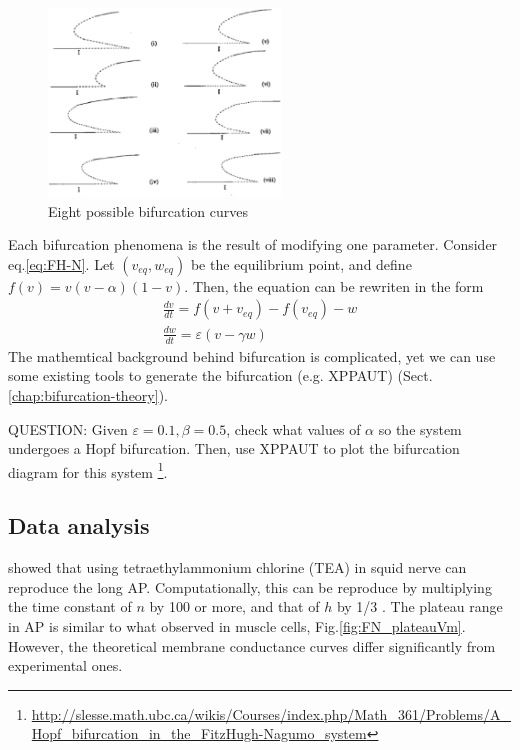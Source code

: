 \begin{figure}[hbt]
  \centerline{\includegraphics[height=5cm,
    angle=0]{./images/FitzHugh-8-bifurcations.eps}}
  \caption{Eight possible bifurcation curves}
  \label{fig:FitzHugh-bifurcation}
\end{figure}

Each bifurcation phenomena is the result of modifying one parameter. Consider
eq.\eqref{eq:FH-N}. Let $(v_{eq}, w_{eq})$ be the equilibrium point, and define
$f(v)=v(v-\alpha)(1-v)$. Then, the equation can be rewriten in the form
\begin{eqnarray}
\frac{dv}{dt} = f(v+v_{eq})-f(v_{eq}) - w \\
\frac{dw}{dt} = \varepsilon (v- \gamma w)
\end{eqnarray}
The mathemtical background behind bifurcation is complicated, yet we can use
some existing tools to generate the bifurcation (e.g. XPPAUT)
(Sect.\ref{chap:bifurcation-theory}). 

QUESTION: Given $\varepsilon=0.1, \beta=0.5$, check what values of $\alpha$ so
the system undergoes a Hopf bifurcation. Then, use XPPAUT to plot the
bifurcation diagram for this system
 \footnote{\url{http://slesse.math.ubc.ca/wikis/Courses/index.php/Math_361/Problems/A_Hopf_bifurcation_in_the_FitzHugh-Nagumo_system}}.



\subsection{Data analysis}

\citep{tasaki1957}
showed that using tetraethylammonium chlorine (TEA) in squid nerve can reproduce
the long AP. Computationally, this can be reproduce by multiplying the time
constant of $n$ by 100 or more, and that of $h$ by 1/3 \citep{fitzhugh1960tph}.
The plateau range in AP is similar to what observed in muscle cells,
Fig.\ref{fig:FN_plateauVm}. However, the theoretical membrane conductance curves
differ significantly from experimental ones.

